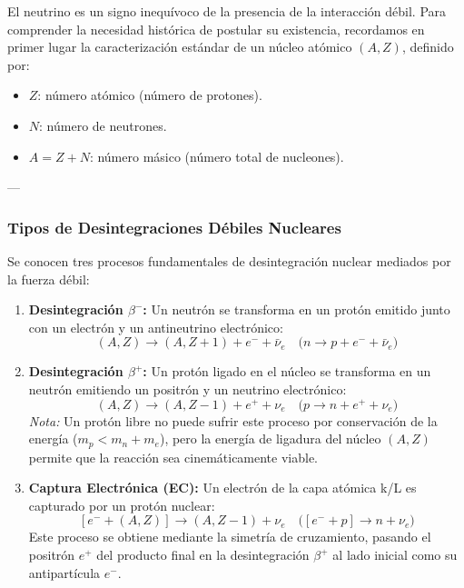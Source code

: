 El neutrino es un signo inequívoco de la presencia de la interacción débil. Para comprender la necesidad histórica de postular su existencia, recordamos en primer lugar la caracterización estándar de un núcleo atómico $(A, Z)$, definido por:
\begin{itemize}
    \item $Z$: número atómico (número de protones).
    \item $N$: número de neutrones.
    \item $A = Z + N$: número másico (número total de nucleones).
\end{itemize}

---

\subsubsection{Tipos de Desintegraciones Débiles Nucleares}

Se conocen tres procesos fundamentales de desintegración nuclear mediados por la fuerza débil:

\begin{enumerate}[label=\arabic*)]
    \item \textbf{Desintegración $\beta^-$:}
    Un neutrón se transforma en un protón emitido junto con un electrón y un antineutrino electrónico:
    \begin{equation}
    (A, Z) \longrightarrow (A, Z+1) + e^- + \bar{\nu}_e \quad \Big( n \longrightarrow p + e^- + \bar{\nu}_e \Big)
    \end{equation}

    \item \textbf{Desintegración $\beta^+$:}
    Un protón ligado en el núcleo se transforma en un neutrón emitiendo un positrón y un neutrino electrónico:
    \begin{equation}
    (A, Z) \longrightarrow (A, Z-1) + e^+ + \nu_e \quad \Big( p \longrightarrow n + e^+ + \nu_e \Big)
    \end{equation}
    \textit{Nota:} Un protón libre no puede sufrir este proceso por conservación de la energía ($m_p < m_n + m_e$), pero la energía de ligadura del núcleo $(A,Z)$ permite que la reacción sea cinemáticamente viable.

    \item \textbf{Captura Electrónica (EC):}
    Un electrón de la capa atómica k/L es capturado por un protón nuclear:
    \begin{equation}
    \left[ e^- + (A, Z) \right] \longrightarrow (A, Z-1) + \nu_e \quad \Big( \left[ e^- + p \right] \longrightarrow n + \nu_e \Big)
    \end{equation}
    Este proceso se obtiene mediante la simetría de cruzamiento, pasando el positrón $e^+$ del producto final en la desintegración $\beta^+$ al lado inicial como su antipartícula $e^-$.
\end{enumerate}

